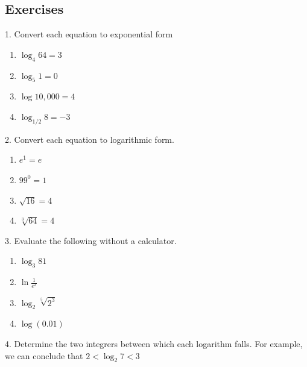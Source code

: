 \documentclass[10pt,]{book}
\theoremstyle{plain}
\theoremstyle{definition}
\theoremstyle{definition}
\theoremstyle{definition}
\numberwithin{equation}{section}
\newcommand{\lt}{<}
\begin{document}
\subsection[{Exercises}]{Exercises}\label{exercises-12}
\begin{exerciselist}
\item[1.]\hypertarget{exercise-75}{}\hypertarget{p-299}{}%
Convert each equation to exponential form%
\leavevmode%
\begin{enumerate}[label=(\alph*)]
\item\hypertarget{li-180}{}\(\log_4 64 = 3\)%
\item\hypertarget{li-181}{}\(\log_5 1 = 0\)%
\item\hypertarget{li-182}{}\(\log 10,000 = 4\)%
\item\hypertarget{li-183}{}\(\log_{1/2} 8 = -3\)%
\end{enumerate}
\par\smallskip
\item[2.]\hypertarget{exercise-76}{}\hypertarget{p-300}{}%
Convert each equation to logarithmic form.%
\leavevmode%
\begin{enumerate}[label=(\alph*)]
\item\hypertarget{li-184}{}\(e^1 = e\)%
\item\hypertarget{li-185}{}\(99^0 = 1\)%
\item\hypertarget{li-186}{}\(\sqrt{16} = 4\)%
\item\hypertarget{li-187}{}\(\sqrt[3]{64} = 4\)%
\end{enumerate}
\par\smallskip
\item[3.]\hypertarget{exercise-77}{}\hypertarget{p-301}{}%
Evaluate the following without a calculator.%
\leavevmode%
\begin{enumerate}[label=(\alph*)]
\item\hypertarget{li-188}{}\(\log_3 81\)%
\item\hypertarget{li-189}{}\(\ln \frac{1}{e^3}\)%
\item\hypertarget{li-190}{}\(\log_2 \sqrt[5]{2^3}\)%
\item\hypertarget{li-191}{}\(\log \left( 0.01 \right)\)%
\end{enumerate}
\par\smallskip
\item[4.]\hypertarget{exercise-78}{}\hypertarget{p-302}{}%
Determine the two integrers between which each logarithm falls. For example, we can conclude that \(2 \lt \log_2 7 \lt 3\)%
\leavevmode%
\begin{enumerate}[label=(\alph*)]

\end{enumerate}
\end{exerciselist}
\end{document}
